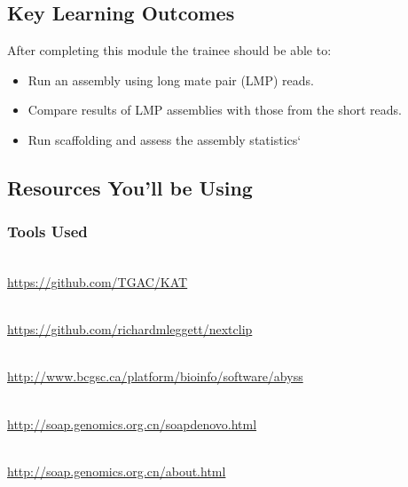 

\chapter{\moduleTitle}
\newpage

\section{Key Learning Outcomes}

After completing this module the trainee should be able to:
\begin{itemize}
  \item Run an assembly using long mate pair (LMP) reads. 
  \item Compare results of LMP assemblies with those from the short reads.
  \item Run scaffolding and assess the assembly statistics`

\end{itemize}

\section{Resources You'll be Using}
 
\subsection{Tools Used}
\begin{description}[style=multiline,labelindent=0cm,align=left,leftmargin=0.5cm]
  \item[Kmer Analysis Tool kit]\hfill\\
  	\url{https://github.com/TGAC/KAT}
  \item[Nextclip]\hfill\\
  	\url{https://github.com/richardmleggett/nextclip}
  \item[Abyss]\hfill\\
  	\url{http://www.bcgsc.ca/platform/bioinfo/software/abyss}
  \item[Soap Denovo]\hfill\\
  	\url{http://soap.genomics.org.cn/soapdenovo.html}
  \item[SOAPec]\hfill\\
  	\url{http://soap.genomics.org.cn/about.html}
\end{description}



